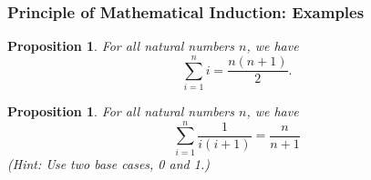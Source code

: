 \documentclass[handout]{beamer}
\newtheorem{prop}[thm]{Proposition}
\begin{document}
\begin{frame}
\frametitle{Principle of Mathematical Induction: Examples}

\begin{prop}
For all natural numbers $n$, we have \[ \sum_{i=1}^n i = \frac{n(n+1)}{2}. \]
\end{prop} \pause

\begin{prop}
For all natural numbers $n$, we have \[ \sum_{i=1}^n \frac{1}{i(i+1)} = \frac{n}{n+1} \] (Hint: Use two base cases, 0 and 1.)
\end{prop}
\end{frame}
\end{document}
